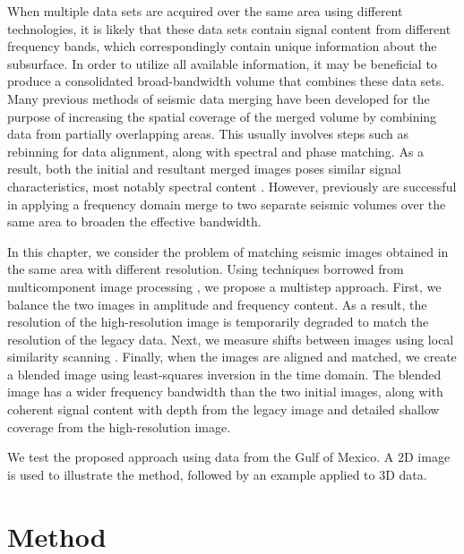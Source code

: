    When multiple data sets are acquired over the same area using different technologies, it is likely that these data sets contain signal content from different frequency bands, which correspondingly contain unique information about the subsurface. 
    In order to utilize all available information, it may be beneficial to produce a consolidated broad-bandwidth volume that combines these data sets.
    Many previous methods of seismic data merging have been developed for the purpose of increasing the spatial coverage of the merged volume by combining data from partially overlapping areas. 
    This usually involves steps such as rebinning for data alignment, along with spectral and phase matching.
    As a result, both the initial and resultant merged images poses similar signal characteristics, most notably spectral content \cite[]{kavery,gabor,supermerge}. 
    However, previously \cite{freqmerge} are successful in applying a frequency domain merge to two separate seismic volumes over the same area to broaden the effective bandwidth.
    
    In this chapter, we consider the problem of matching seismic images obtained in the same area with different resolution. 
    Using techniques borrowed from multicomponent image processing \cite[]{warp}, we propose a multistep approach. 
    First, we balance the two images in amplitude and frequency content. 
    As a result, the resolution of the high-resolution image is temporarily degraded to match the resolution of the legacy data. 
    Next, we measure shifts between images using local similarity scanning \cite[]{attr,timelapse}.
    Finally, when the images are aligned and matched, we create a blended image using least-squares inversion in the time domain. 
    The blended image has a wider frequency bandwidth than the two initial images, along with coherent signal content with depth from the legacy image and detailed shallow coverage from the high-resolution image. 
    
    We test the proposed approach using data from the Gulf of Mexico. 
    A 2D image is used to illustrate the method, followed by an example applied to 3D data.


\section{Method}
    
